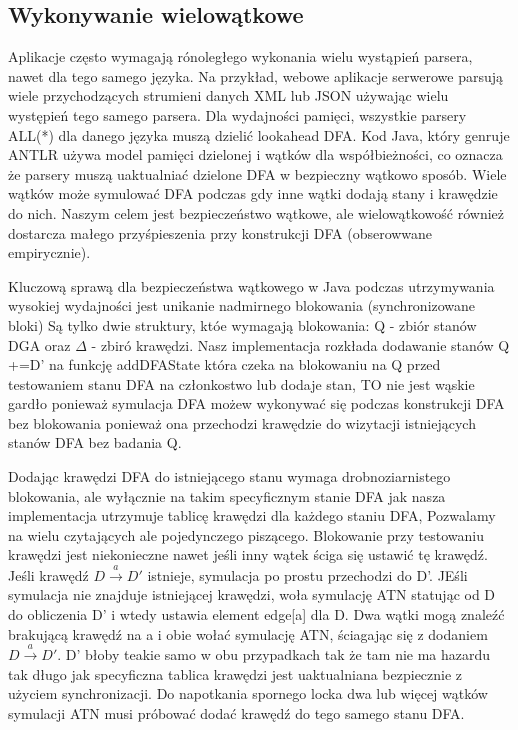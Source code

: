 ﻿\subsection{Wykonywanie wielowątkowe}
Aplikacje często wymagają rónoległego wykonania wielu wystąpień
parsera, nawet dla tego samego języka. Na przykład, webowe
aplikacje serwerowe parsują wiele przychodzących strumieni danych
XML lub JSON używając wielu występień tego samego parsera. Dla
wydajności pamięci, wszystkie parsery ALL(*) dla danego języka
muszą dzielić lookahead DFA. Kod Java, który genruje
ANTLR używa model pamięci dzielonej i wątków dla współbieżności,
co oznacza że parsery muszą uaktualniać dzielone DFA
w bezpieczny wątkowo sposób. Wiele wątków może symulować DFA
podczas gdy inne wątki dodają stany i krawędzie do nich.
Naszym celem jest bezpieczeństwo wątkowe, ale wielowątkowość
również dostarcza małego przyśpieszenia przy konstrukcji DFA
(obserowwane empirycznie).
\par
Kluczową sprawą  dla bezpieczeństwa wątkowego w Java podczas
utrzymywania wysokiej wydajności jest unikanie nadmirnego blokowania
(synchronizowane bloki) Są tylko dwie struktury, któe wymagają blokowania:
Q - zbiór stanów DGA oraz $\Delta$ - zbiró krawędzi. Nasz implementacja
rozkłada dodawanie stanów Q +=D' na funkcję addDFAState
która czeka na blokowaniu na Q przed testowaniem stanu DFA
na członkostwo lub dodaje stan, TO nie jest wąskie gardło
ponieważ symulacja DFA możew wykonywać się podczas
konstrukcji DFA bez blokowania ponieważ ona przechodzi
krawędzie do wizytacji istniejących stanów DFA bez badania Q.
\par
Dodając krawędzi DFA do istniejącego stanu wymaga drobnoziarnistego
blokowania, ale wyłącznie na takim specyficznym stanie DFA
jak nasza implementacja utrzymuje tablicę krawędzi dla każdego
staniu DFA, Pozwalamy na wielu czytających ale pojedynczego piszącego.
Blokowanie przy testowaniu krawędzi jest niekonieczne nawet
jeśli inny wątek ściga się ustawić tę krawędź.
Jeśli krawędź $D\overset{a}{\rightarrow}D'$ istnieje, symulacja
po prostu przechodzi do D'. JEśli symulacja nie znajduje istniejącej
krawędzi, woła symulację ATN statując od D do obliczenia D' i wtedy
ustawia element edge[a] dla D. Dwa wątki mogą znaleźć brakującą
krawędź na a i obie wołać symulację ATN, ściagając się z dodaniem
$D\overset{a}{\rightarrow}D'$.
D' błoby teakie samo w obu przypadkach tak że tam nie ma hazardu
tak długo jak specyficzna tablica krawędzi jest uaktualniana
bezpiecznie z użyciem synchronizacji.
Do napotkania spornego locka dwa lub więcej wątków symulacji ATN
musi próbować dodać krawędź do tego samego stanu DFA.
